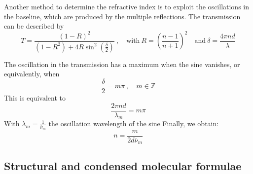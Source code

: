 \documentclass[12pt]{article}
\begin{document}
Another method to determine the refractive index is to exploit the oscillations in the baseline, which are produced by the multiple reflections. The transmission can be described by 
\begin{equation}
    T = \frac{(1-R)^2}{(1-R^2) + 4R \sin^2\left( \frac{\delta}{2} \right)} \ , \quad \text{with} \ R = \left( \frac{n-1}{n+1} \right)^2 \quad \text{and} \ \delta = \frac{4 \pi n d}{\lambda} 
\end{equation}

The oscillation in the transmission has a maximum when the sine vanishes, or equivalently, when 
\begin{equation}
    \frac{\delta}{2} = m \pi \ , \quad m \in \mathbb{Z}
\end{equation}
This is equivalent to 
\begin{equation}
    \frac{2 \pi n d}{\lambda_m} = m \pi 
\end{equation}
With $\lambda_m = \frac{1}{\overline{\nu}_m}$ the oscillation wavelength of the sine
Finally, we obtain:
\begin{equation}
    n = \frac{m}{2d \overline{\nu}_m}
    \label{eq:SpectrumRefractiveIndex}
\end{equation}

\newpage
\subsection{Structural and condensed molecular formulae}
\end{document}
